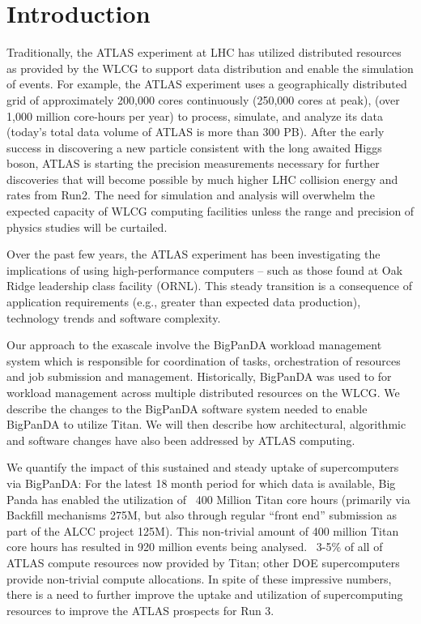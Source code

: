 

\section{Introduction}
\label{intro}

Traditionally, the ATLAS experiment at LHC has utilized distributed resources
as provided by the WLCG to support data distribution and enable the simulation
of events.  For example, the ATLAS experiment uses a geographically distributed
grid of approximately 200,000 cores continuously (250,000 cores at peak), (over
1,000 million core-hours per year) to process, simulate, and analyze its data
(today's total data volume of ATLAS is more than 300 PB). After the early
success in discovering a new particle consistent with the long awaited Higgs
boson, ATLAS is starting the precision measurements necessary for further
discoveries that will become possible by much higher LHC collision energy and
rates from Run2. The need for simulation and analysis will overwhelm the
expected capacity of WLCG computing facilities unless the range and precision
of physics studies will be curtailed.

Over the past few years, the ATLAS experiment has been investigating the
implications of using high-performance computers -- such as those found at Oak
Ridge leadership class facility (ORNL). This steady transition is a consequence
of application requirements (e.g., greater than expected data production),
technology trends and software complexity.

Our approach to the exascale involve the BigPanDA workload management system
which is responsible for coordination of tasks, orchestration of resources and
job submission and management. Historically, BigPanDA was used to for workload
management across multiple distributed resources on the WLCG. We describe the
changes to the BigPanDA software system needed to enable BigPanDA to utilize
Titan. We will then describe how architectural, algorithmic and software
changes have also been addressed by ATLAS computing.

We quantify the impact of this sustained and steady uptake of supercomputers
via BigPanDA: For the latest 18 month period for which data is available, Big
Panda has enabled the utilization of ~400 Million Titan core hours (primarily
via Backfill mechanisms 275M, but also through regular ``front end'' submission
as part of the ALCC project 125M). This non-trivial amount of 400 million Titan
core hours has resulted in 920 million events being analysed. ~3-5\% of all of
ATLAS compute resources now provided by Titan; other DOE supercomputers provide
non-trivial compute allocations. In spite of these impressive numbers, there is
a need to further improve the uptake and utilization of supercomputing
resources to improve the ATLAS prospects for Run 3. 

